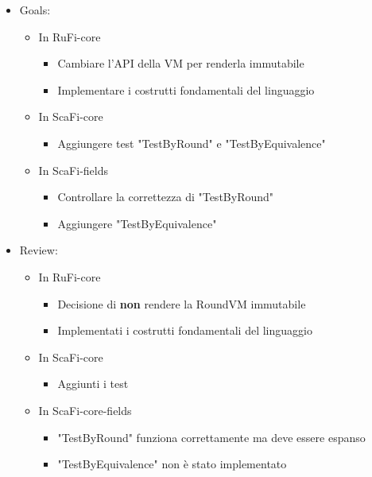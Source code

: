 \documentclass[12pt, a4paper]{article}
\begin{document}
\begin{itemize}
    \item Goals:
          \begin{itemize}
              \item In RuFi-core
                    \begin{itemize}
                        \item Cambiare l'API della VM per renderla immutabile
                        \item Implementare i costrutti fondamentali del linguaggio
                    \end{itemize}
              \item In ScaFi-core
                    \begin{itemize}
                        \item Aggiungere test "TestByRound" e "TestByEquivalence"
                    \end{itemize}
              \item In ScaFi-fields
                    \begin{itemize}
                        \item Controllare la correttezza di "TestByRound"
                        \item Aggiungere "TestByEquivalence"
                    \end{itemize}
          \end{itemize}
    \item Review:
          \begin{itemize}
              \item In RuFi-core
                    \begin{itemize}
                        \item Decisione di \textbf{non} rendere la RoundVM immutabile
                        \item Implementati i costrutti fondamentali del linguaggio
                    \end{itemize}
              \item In ScaFi-core
                    \begin{itemize}
                        \item Aggiunti i test
                    \end{itemize}
              \item In ScaFi-core-fields
                    \begin{itemize}
                        \item "TestByRound" funziona correttamente ma deve essere espanso
                        \item "TestByEquivalence" non è stato implementato
                    \end{itemize}
          \end{itemize}
\end{itemize}
\end{document}
